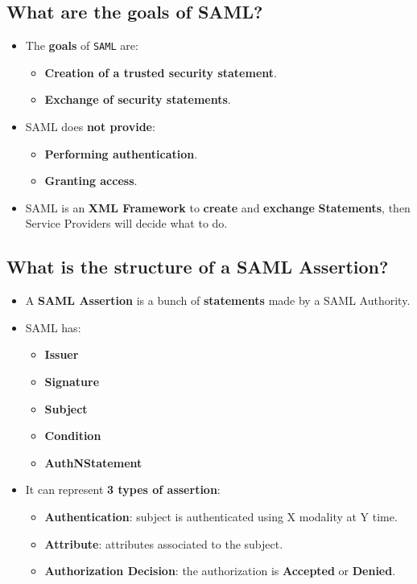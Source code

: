 \documentclass[9pt, letterpaper]{article}
\begin{document}
\subsection{What are the goals of SAML?}
\begin{itemize}
	\item The \textbf{goals} of {\tt SAML} are:
	      \begin{itemize}
		      \item \textbf{Creation of a trusted security statement}.
		      \item \textbf{Exchange of security statements}.
	      \end{itemize}
	\item SAML does \textbf{not provide}:
	      \begin{itemize}
		      \item \textbf{Performing authentication}.
		      \item \textbf{Granting access}.
	      \end{itemize}
	\item SAML is an \textbf{XML Framework} to \textbf{create} and \textbf{exchange} \textbf{Statements}, then Service Providers will decide what to do.
\end{itemize}

\subsection{What is the structure of a SAML Assertion?}
\begin{itemize}
	\item A \textbf{SAML Assertion} is a bunch of \textbf{statements} made by a SAML Authority.
	\item SAML has:
	      \begin{itemize}
		      \item \textbf{Issuer}
		      \item \textbf{Signature}
		      \item \textbf{Subject}
		      \item \textbf{Condition}
		      \item \textbf{AuthNStatement}
	      \end{itemize}
	\item It can represent \textbf{3 types of assertion}:
	      \begin{itemize}
		      \item \textbf{Authentication}: subject is authenticated using X modality at Y time.
		      \item \textbf{Attribute}: attributes associated to the subject.
		      \item \textbf{Authorization Decision}: the authorization is \textbf{Accepted} or \textbf{Denied}.
	      \end{itemize}
\end{itemize}
\end{document}
